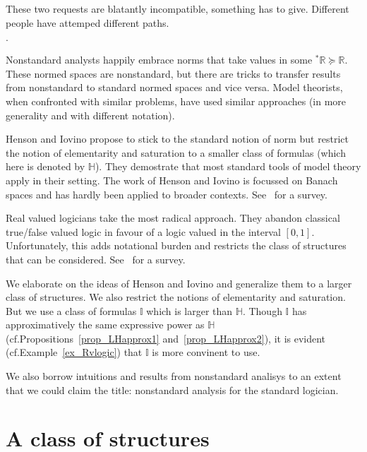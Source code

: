 \documentclass[10pt,oneside]{amsproc}
\newcommand{\mylabel}[1]{{#1}\hfill}
\renewenvironment{itemize}
  {\begin{list}{$\cdot$}{%
  \setlength{\parskip}{0mm}
  \setlength{\topsep}{.4\baselineskip}
  \setlength{\rightmargin}{0mm}
  \setlength{\listparindent}{0mm}
  \setlength{\itemindent}{0mm}
  \setlength{\labelwidth}{3ex}
  \setlength{\itemsep}{.2\baselineskip}
  \setlength{\parsep}{.2\baselineskip}
  \setlength{\partopsep}{0mm}
  \setlength{\labelsep}{1ex}
  \setlength{\leftmargin}{\labelwidth+\labelsep}
  \let\makelabel\mylabel}}{%
\end{list}}
\begin{document}
These two requests are blatantly incompatible, something has to give.
Different people have attemped different paths.
\begin{itemize}
  \item[1.] Nonstandard analysts happily embrace norms that take values in some ${}^*\mathds{R}\succeq\mathds{R}$.
  These normed spaces are nonstandard, but there are tricks to transfer results from nonstandard to standard normed spaces and vice versa.
  Model theorists, when confronted with similar problems, have used similar approaches (in more generality and with different notation).
  \item[2.] Henson and Iovino propose to stick to the standard notion of norm but restrict the notion of elementarity and saturation to a smaller class of formulas (which here is denoted by $\mathds{H}$).
  They demostrate that most standard tools of model theory apply in their setting. 
  The work of Henson and Iovino is focussed on Banach spaces and has hardly been applied to broader contexts. See~\cite{HI} for a survey.
  \item[3.] Real valued logicians take the most radical approach.
  They abandon classical true/false valued logic in favour of a logic valued in the interval $[0,1]$.
  Unfortunately, this adds notational burden and restricts the class of structures that can be considered. See~\cite{K} for a survey. 
\end{itemize}

We elaborate on the ideas of Henson and Iovino and generalize them to a larger class of structures.
We also restrict the notions of elementarity and saturation.
But we use a class of formulas $\mathds{I}$ which is larger than $\mathds{H}$.
Though $\mathds{I}$ has approximatively the same expressive power as $\mathds{H}$ (cf.\@ Propositions~\ref{prop_LHapprox1} and~\ref{prop_LHapprox2}), it is evident (cf.\@ Example~\ref{ex_Rvlogic}) that $\mathds{I}$ is more convinent to use.

We also borrow intuitions and results from nonstandard analisys to an extent that we could claim the title: nonstandard analysis for the standard logician.


\section{A class of structures}\label{uno}
\end{document}
